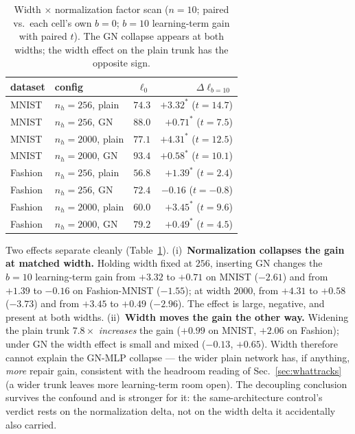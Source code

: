 \documentclass[review,12pt,number]{elsarticle}
\begin{document}
\begin{table}[t]
\centering\small
\caption{Width $\times$ normalization factor scan ($n{=}10$; paired
vs.\ each cell's own $b{=}0$; $b{=}10$ learning-term gain with paired
$t$). The GN collapse appears at both widths; the width effect on the
plain trunk has the opposite sign.}
\label{tab:twobytwo}
\begin{tabular}{llrr}
\toprule
dataset & config & $\ell_0$ & $\Delta\ell_{b=10}$ \\
\midrule
MNIST & $n_h{=}256$, plain & $74.3$ & $+3.32^{*}$ ($t{=}14.7$) \\
MNIST & $n_h{=}256$, GN    & $88.0$ & $+0.71^{*}$ ($t{=}7.5$) \\
MNIST & $n_h{=}2000$, plain & $77.1$ & $+4.31^{*}$ ($t{=}12.5$) \\
MNIST & $n_h{=}2000$, GN    & $93.4$ & $+0.58^{*}$ ($t{=}10.1$) \\
\midrule
Fashion & $n_h{=}256$, plain & $56.8$ & $+1.39^{*}$ ($t{=}2.4$) \\
Fashion & $n_h{=}256$, GN    & $72.4$ & $-0.16$ ($t{=}-0.8$) \\
Fashion & $n_h{=}2000$, plain & $60.0$ & $+3.45^{*}$ ($t{=}9.6$) \\
Fashion & $n_h{=}2000$, GN    & $79.2$ & $+0.49^{*}$ ($t{=}4.5$) \\
\bottomrule
\end{tabular}
\end{table}

Two effects separate cleanly (Table~\ref{tab:twobytwo}).
(i)~\textbf{Normalization collapses the gain at matched width.}
Holding width fixed at $256$, inserting GN changes the $b{=}10$
learning-term gain from $+3.32$ to $+0.71$ on MNIST ($-2.61$) and from
$+1.39$ to $-0.16$ on Fashion-MNIST ($-1.55$); at width $2000$, from
$+4.31$ to $+0.58$ ($-3.73$) and from $+3.45$ to $+0.49$ ($-2.96$).
The effect is large, negative, and present at both widths.
(ii)~\textbf{Width moves the gain the other way.} Widening the plain
trunk $7.8\times$ \emph{increases} the gain ($+0.99$ on MNIST,
$+2.06$ on Fashion); under GN the width effect is small and mixed
($-0.13$, $+0.65$). Width therefore cannot explain the GN-MLP
collapse --- the wider plain network has, if anything, \emph{more}
repair gain, consistent with the headroom reading of
Sec.~\ref{sec:whattracks} (a wider trunk leaves more learning-term
room open). The decoupling conclusion survives the confound and is
stronger for it: the same-architecture control's verdict rests on the
normalization delta, not on the width delta it accidentally also
carried.
\end{document}
